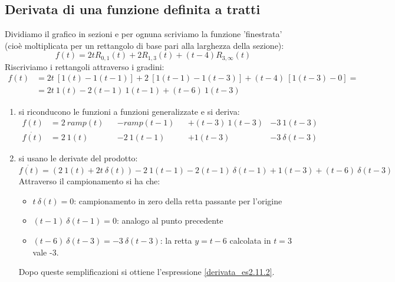 \documentclass[../main.tex]{subfiles}
\begin{document}
	\subsection{Derivata di una funzione definita a tratti}
	Dividiamo il grafico in sezioni e per ognuna scriviamo la funzione 'finestrata' (cioè moltiplicata per un rettangolo di base pari alla larghezza della sezione):
	$$ f(t) = 2t R_{0,1}(t) + 2 R_{1,3}(t) + (t-4)R_{3,\infty}(t) $$
	Riscriviamo i rettangoli attraverso i gradini:
	\begin{align*}
		f(t) &= 2t\ [1(t) - 1(t-1)] + 2\ [1(t-1) - 1(t-3)] + (t-4)\ [1(t-3) - 0] =\\
		&= 2t\ 1(t) - 2(t-1)\ 1(t-1) + (t-6)\ 1(t-3)
	\end{align*}
	\begin{enumerate}
		\item si riconducono le funzioni a funzioni generalizzate e si deriva:
			\begin{align}
				f(t) &= 2\ ramp(t) & &- ramp(t-1) & &+ (t-3)\ 1(t-3) & - 3\ 1(t-3) \nonumber\\
				\dot{f(t)} &= 2\ 1(t) & &- 2\ 1(t-1) & &+ 1(t-3) & - 3\ \delta(t-3)
				\label{derivata_es2.11.2}
			\end{align}
		\item si usano le derivate del prodotto:
		$$ \dot{f(t)} = (2\ 1(t) + 2t\ \delta(t)) - 2\ 1(t-1) - 2(t-1)\ \delta(t-1) + 1(t-3) + (t-6)\ \delta(t-3) $$
		Attraverso il campionamento si ha che:
		\begin{itemize}
			\item $ t\ \delta(t) = 0 $: campionamento in zero della retta passante per l'origine
			\item $ (t-1)\ \delta(t-1) = 0$: analogo al punto precedente
			\item $ (t-6)\ \delta(t-3) = - 3\ \delta(t-3) $: la retta $ y=t-6 $ calcolata in $ t=3 $ vale -3. 
		\end{itemize}
		Dopo queste semplificazioni si ottiene l'espressione \ref{derivata_es2.11.2}.
	\end{enumerate}
\end{document}
